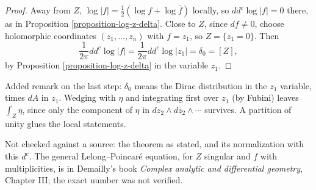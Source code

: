 \begin{proof}
Away from $Z$, $\log|f|=\frac{1}{2}(\log
f+\log\bar f)$ locally, so
$dd^c\log|f|=0$ there, as in Proposition
\ref{proposition-log-z-delta}. Close to $Z$,
since $df\neq 0$, choose holomorphic
coordinates $(z_1,\ldots,z_n)$ with $f=z_1$,
so $Z=\{z_1=0\}$. Then
$$
\frac{1}{2\pi}dd^c\log|f|
=\frac{1}{2\pi}dd^c\log|z_1|
=\delta_0=[Z],
$$
by Proposition
\ref{proposition-log-z-delta} in the
variable $z_1$.
\end{proof}

\noindent
Added remark on the last step: $\delta_0$
means the Dirac distribution in the $z_1$
variable, times $dA$ in $z_1$. Wedging with
$\eta$ and integrating first over $z_1$ (by
Fubini) leaves $\int_Z\eta$, since only the
component of $\eta$ in
$dz_2\wedge d\bar z_2\wedge\cdots$ survives.
A partition of unity glues the local
statements.

Not checked against a source: the theorem as
stated, and its normalization with this
$d^c$. The general Lelong--Poincar\'e
equation, for $Z$ singular and $f$ with
multiplicities, is in Demailly's book
\emph{Complex analytic and differential
geometry}, Chapter III; the exact number was
not verified.



